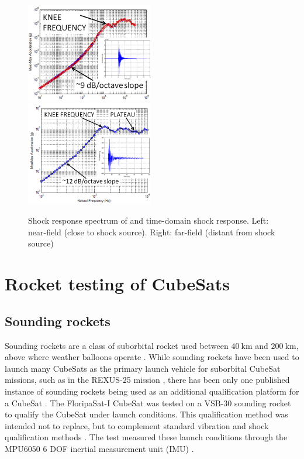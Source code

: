 \documentclass[]{report}
\begin{document}
\begin{figure}[H]
  \includegraphics[width=0.495\textwidth]{images/pyroshock2.png}
  \includegraphics[width=0.495\textwidth]{images/pyroshock1.png}
  \caption{Shock response spectrum of and time-domain shock response. Left: near-field (close to shock source). Right: far-field (distant from shock source) \cite{nasa-pyroshock}}
  \label{fig:pyroshock}
\end{figure}


\section{Rocket testing of CubeSats}
\subsection{Sounding rockets}
Sounding rockets are a class of suborbital rocket used between $\SI{40}{\kilo\metre}$ and $\SI{200}{\kilo\metre}$, above where weather balloons operate \cite{seibert2006history}. While sounding rockets have been used to launch many CubeSats as the primary launch vehicle for suborbital CubeSat missions, such as in the REXUS-25 mission \cite{pont2019rexus}, there has been only one published instance of sounding rockets being used as an additional qualification platform for a CubeSat \cite{slongo2019pre}. The FloripaSat-I CubeSat was tested on a VSB-30 sounding rocket \cite{slongo2019pre} to qualify the CubeSat under launch conditions. This qualification method was intended not to replace, but to complement standard vibration and shock qualification methods \cite{slongo2019pre}. The test measured these launch conditions through the MPU6050 6 DOF inertial measurement unit (IMU) \cite{slongo2019pre}.
\end{document}
